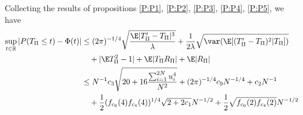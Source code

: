 Collecting the results of propositions \ref{P:P1}, \ref{P:P2}, \ref{P:P3}, \ref{P:P4}, \ref{P:P5},
we have
\begin{equation*}
  \begin{split}
    \sup_{t \in \mathbb{R}} |P(T_{\Pi} \leq t) - \Phi(t)|
    &\leq (2\pi)^{-1/4} \sqrt{\frac{\E |T_{\Pi}'-T_{\Pi}|^3}{\lambda}}
    + \frac{1}{2\lambda} \sqrt{\var (\E [(T_{\Pi}'-T_{\Pi})^2|T_{\Pi}])} \\
    &\quad + |\E T_{\Pi}^2 - 1| + \E |T_{\Pi}R_{\Pi}| + \E |R_{\Pi}| \\
    &\leq N^{-1} c_3\sqrt{20 + 16\frac{\sum_{i=1}^{2N} u_{i}^4}{N^2}} + 
    (2\pi)^{-1/4} c_9 N^{-1/4} + c_2 N^{-1} \\
    &\quad + \frac{1}{2}(f_{c_6}(4)f_{c_4}(4))^{1/4} \sqrt{2+2c_1} N^{-1/2} +
    \frac{1}{2}\sqrt{f_{c_6}(2)f_{c_4}(2)} N^{-1/2}
  \end{split}
\end{equation*}